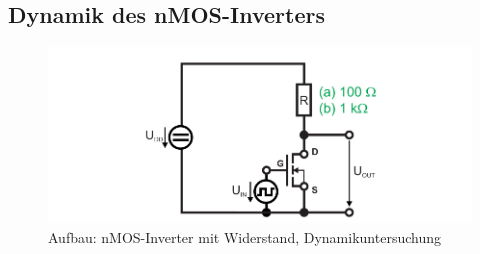 \documentclass[10pt]{scrreprt}
\begin{document}
    \subsection{Dynamik des nMOS-Inverters}
    \begin{figure}[H]
        \includegraphics[width=\textwidth]{abb14.png}
        \caption{Aufbau: nMOS-Inverter mit Widerstand, Dynamikuntersuchung}
        \label{fig:abb14}
    \end{figure}
\end{document}

